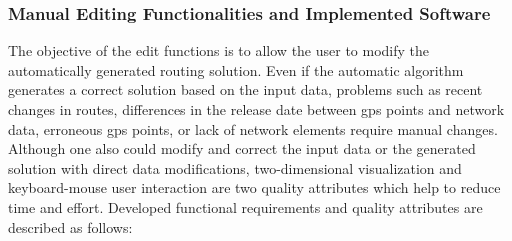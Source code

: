 \subsubsection{Manual Editing Functionalities and Implemented Software}
The objective of the edit functions is to allow the user to modify the automatically generated routing solution. Even if the automatic algorithm generates a correct solution based on the input data, problems such as recent changes in routes, differences in the release date between \gls{gps} points and network data, erroneous \gls{gps} points, or lack of network elements require manual changes. Although one also could modify and correct the input data or the generated solution with direct data modifications, two-dimensional visualization and keyboard-mouse user interaction are two quality attributes which help to reduce time and effort. Developed functional requirements and quality attributes are described as follows:
%
